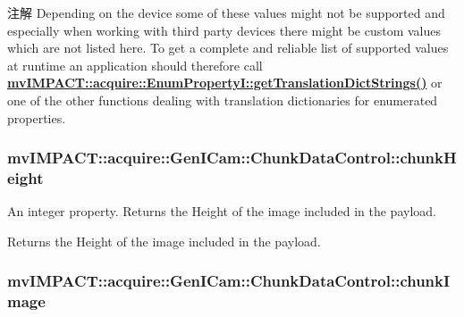 \begin{DoxyNote}{注解}
Depending on the device some of these values might not be supported and especially when working with third party devices there might be custom values which are not listed here. To get a complete and reliable list of supported values at runtime an application should therefore call {\bfseries \hyperlink{classmv_i_m_p_a_c_t_1_1acquire_1_1_enum_property_i_a0ba6ccbf5ee69784d5d0b537924d26b6}{mv\+I\+M\+P\+A\+C\+T\+::acquire\+::\+Enum\+Property\+I\+::get\+Translation\+Dict\+Strings()}} or one of the other functions dealing with translation dictionaries for enumerated properties. 
\end{DoxyNote}
\hypertarget{classmv_i_m_p_a_c_t_1_1acquire_1_1_gen_i_cam_1_1_chunk_data_control_a333f4b2dfbc993bfbd6dbfc6049ca36e}{
\subsubsection[{chunk\+Height}]{ mv\+I\+M\+P\+A\+C\+T\+::acquire\+::\+Gen\+I\+Cam\+::\+Chunk\+Data\+Control\+::chunk\+Height}}\label{classmv_i_m_p_a_c_t_1_1acquire_1_1_gen_i_cam_1_1_chunk_data_control_a333f4b2dfbc993bfbd6dbfc6049ca36e}


An integer property. Returns the Height of the image included in the payload. 

Returns the Height of the image included in the payload. \hypertarget{classmv_i_m_p_a_c_t_1_1acquire_1_1_gen_i_cam_1_1_chunk_data_control_ac35c9adb7b18011c9dcae2b2e07fd728}{
\subsubsection[{chunk\+Image}]{ mv\+I\+M\+P\+A\+C\+T\+::acquire\+::\+Gen\+I\+Cam\+::\+Chunk\+Data\+Control\+::chunk\+Image}}\label{classmv_i_m_p_a_c_t_1_1acquire_1_1_gen_i_cam_1_1_chunk_data_control_ac35c9adb7b18011c9dcae2b2e07fd728}


